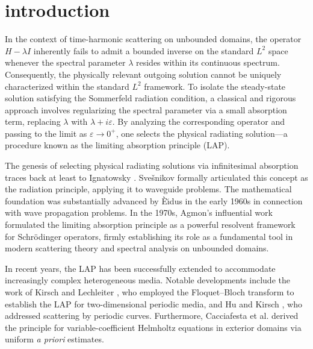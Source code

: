 \documentclass[12pt,reqno]{amsart}
\numberwithin{equation}{section}
\begin{document}
\section{introduction}
In the context of time-harmonic scattering on unbounded domains, the operator $H - \lambda I$ inherently fails to admit a bounded inverse on the standard $L^2$ space whenever the spectral parameter $\lambda$ resides within its continuous spectrum. Consequently, the physically relevant outgoing solution cannot be uniquely characterized within the standard $L^2$ framework. To isolate the steady-state solution satisfying the Sommerfeld radiation condition, a classical and rigorous approach involves regularizing the spectral parameter via a small absorption term, replacing $\lambda$ with $\lambda + i\varepsilon$. By analyzing the corresponding operator and passing to the limit as $\varepsilon \to 0^+$, one selects the physical radiating solution---a procedure  known as the limiting absorption principle (LAP).

The genesis of selecting physical radiating solutions via infinitesimal absorption traces back at least to Ignatowsky \cite{v1905reflexion}. Sve\v{s}nikov \cite{MR37195} formally articulated this concept as the radiation principle, applying it to waveguide problems.
The mathematical foundation was substantially advanced by \`E\u{\i}dus  \cite{MR145187} in the early 1960s in connection with wave propagation  problems. In the 1970s, Agmon's influential work \cite{MR397194}  formulated the limiting absorption principle as a powerful resolvent  framework for Schr\"odinger operators, firmly establishing its role as a  fundamental tool in modern scattering theory and spectral analysis on  unbounded domains.


In recent years, the LAP has been successfully extended to accommodate increasingly complex heterogeneous media. Notable developments include the work of Kirsch and Lechleiter \cite{kirsch2018}, who employed the Floquet--Bloch transform to establish the LAP for two-dimensional periodic media, and Hu and Kirsch \cite{hu2026}, who addressed scattering by periodic curves. Furthermore, Cacciafesta et al. \cite{MR3870070} derived the principle for variable-coefficient Helmholtz equations in exterior domains via uniform \textit{a priori} estimates. 
\end{document}

